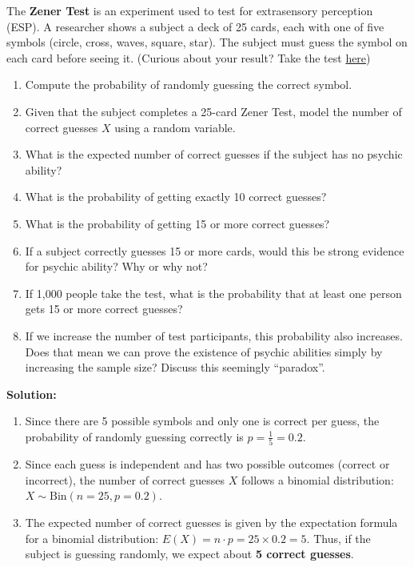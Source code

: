 \documentclass[12pt]{article}
\newif\ifsolutions
\begin{document}
\begin{enumerate}
    The \textbf{Zener Test} is an experiment used to test for extrasensory perception (ESP). A researcher shows a subject a deck of 25 cards, each with one of five symbols (circle, cross, waves, square, star). The subject must guess the symbol on each card before seeing it. (Curious about your result? Take the test \href{https://psychicscience.org/esp3}{here})
    \begin{enumerate}
        \item Compute the probability of randomly guessing the correct symbol.
        \item Given that the subject completes a 25-card Zener Test, model the number of correct guesses \( X \) using a random variable.
        \item What is the expected number of correct guesses if the subject has no psychic ability?
        \item What is the probability of getting exactly 10 correct guesses?
        \item What is the probability of getting 15 or more correct guesses?
        \item If a subject correctly guesses 15 or more cards, would this be strong evidence for psychic ability? Why or why not?
        \item If 1,000 people take the test, what is the probability that at least one person gets 15 or more correct guesses?
        \item If we increase the number of test participants, this probability also increases. Does that mean we can prove the existence of psychic abilities simply by increasing the sample size? Discuss this seemingly ``paradox''.
\end{enumerate}
    
    \ifsolutions \color{blue} \textbf{Solution:} \\
    \begin{enumerate}
        \item Since there are 5 possible symbols and only one is correct per guess, the probability of randomly guessing correctly is $p = \frac{1}{5} = 0.2$.
        
        \item Since each guess is independent and has two possible outcomes (correct or incorrect), the number of correct guesses \( X \) follows a binomial distribution: $X \sim \text{Bin}(n=25, p=0.2)$.

        \item The expected number of correct guesses is given by the expectation formula for a binomial distribution: $E(X) = n \cdot p = 25 \times 0.2 = 5$. Thus, if the subject is guessing randomly, we expect about \textbf{5 correct guesses}.        


\end{enumerate}
\end{enumerate}
\end{document}
